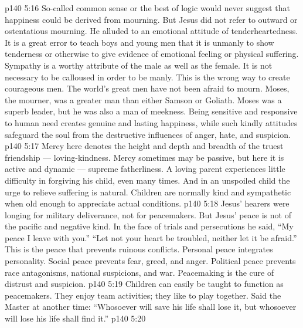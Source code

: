 \vs p140 5:16 \bibnobreakspace {} So\hyp{}called common sense or the best of logic would never suggest that happiness could be derived from mourning. But Jesus did not refer to outward or ostentatious mourning. He alluded to an emotional attitude of tenderheartedness. It is a great error to teach boys and young men that it is unmanly to show tenderness or otherwise to give evidence of emotional feeling or physical suffering. Sympathy is a worthy attribute of the male as well as the female. It is not necessary to be calloused in order to be manly. This is the wrong way to create courageous men. The world’s great men have not been afraid to mourn. Moses, the mourner, was a greater man than either Samson or Goliath. Moses was a superb leader, but he was also a man of meekness. Being sensitive and responsive to human need creates genuine and lasting happiness, while such kindly attitudes safeguard the soul from the destructive influences of anger, hate, and suspicion.
\vs p140 5:17 \pc {}\bibnobreakspace {} Mercy here denotes the height and depth and breadth of the truest friendship --- loving\hyp{}kindness. Mercy sometimes may be passive, but here it is active and dynamic --- supreme fatherliness. A loving parent experiences little difficulty in forgiving his child, even many times. And in an unspoiled child the urge to relieve suffering is natural. Children are normally kind and sympathetic when old enough to appreciate actual conditions.
\vs p140 5:18 \pc {}\bibnobreakspace {} Jesus’ hearers were longing for military deliverance, not for peacemakers. But Jesus’ peace is not of the pacific and negative kind. In the face of trials and persecutions he said, \textcolor{ubdarkred}{“My peace I leave with you.” “Let not your heart be troubled, neither let it be afraid.”} This is the peace that prevents ruinous conflicts. Personal peace integrates personality. Social peace prevents fear, greed, and anger. Political peace prevents race antagonisms, national suspicions, and war. Peacemaking is the cure of distrust and suspicion.
\vs p140 5:19 Children can easily be taught to function as peacemakers. They enjoy team activities; they like to play together. Said the Master at another time: \textcolor{ubdarkred}{“Whosoever will save his life shall lose it, but whosoever will lose his life shall find it.”}
\vs p140 5:20 \pc {}\bibnobreakspace {}
